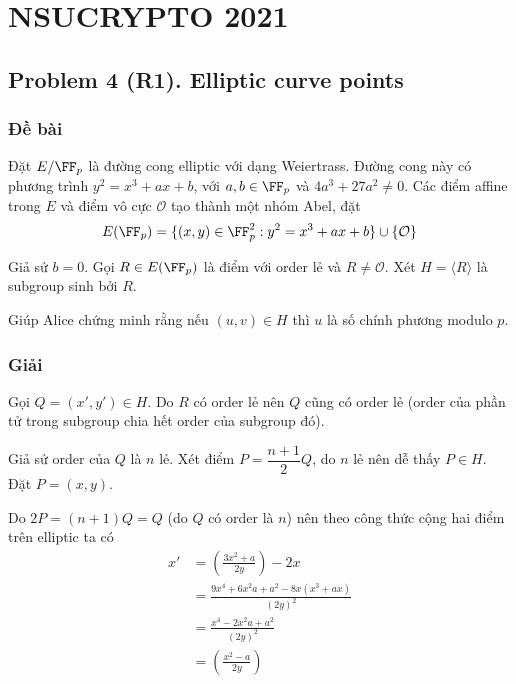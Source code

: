 \chapter*{NSUCRYPTO 2021}

\section*{Problem 4 (R1). Elliptic curve points}

\subsection*{Đề bài}

Đặt $E / \FF_p$ là đường cong elliptic với dạng Weiertrass. Đường cong này có phương trình $y^2 = x^3 + ax + b$, với $a, b \in \FF_p$ và $4a^3 + 27a^2 \neq 0$. Các điểm affine trong $E$ và điểm vô cực $\mathcal{O}$ tạo thành một nhóm Abel, đặt
\begin{equation*}
    E(\FF_p) = \{ (x, y) \in \FF_p^2 : y^2 = x^3 + ax + b \} \cup \{ \mathcal{O} \}
\end{equation*}

Giả sử $b=0$. Gọi $R \in E(\FF_p)$ là điểm với order lẻ và $R \neq \mathcal{O}$. Xét $H = \langle R \rangle$ là subgroup sinh bởi $R$.

Giúp Alice chứng minh rằng nếu $(u, v) \in H$ thì $u$ là số chính phương modulo $p$.

\subsection*{Giải}

Gọi $Q = (x', y') \in H$. Do $R$ có order lẻ nên $Q$ cũng có order lẻ (order của phần tử trong subgroup chia hết order của subgroup đó).

Giả sử order của $Q$ là $n$ lẻ. Xét điểm $P = \dfrac{n+1}{2} Q$, do $n$ lẻ nên dễ thấy $P \in H$. Đặt $P = (x, y)$.

Do $2P = (n+1) Q = Q$ (do $Q$ có order là $n$) nên theo công thức cộng hai điểm trên elliptic ta có
\begin{align*}
    x' & = \left(\frac{3x^2 + a}{2y}\right) - 2x \\
       & = \frac{9x^4 + 6x^2 a + a^2 - 8x(x^3 + ax)}{(2y)^2} \\
       & = \frac{x^4 - 2x^2 a + a^2}{(2y)^2} \\
       & = \left(\frac{x^2-a}{2y}\right)
\end{align*}

